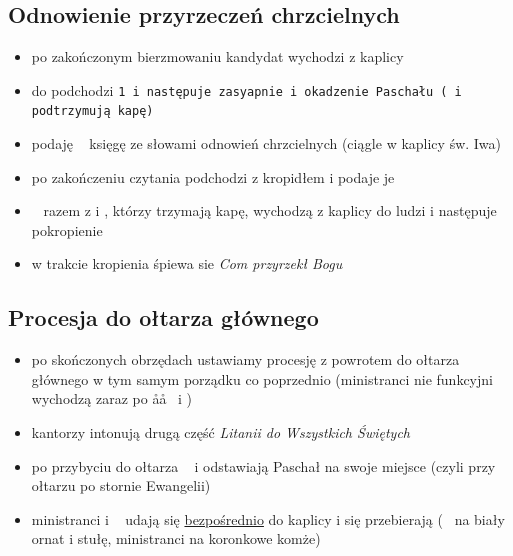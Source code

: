 \subsection{Odnowienie przyrzeczeń chrzcielnych}
\begin{itemize}
	\item po zakończonym bierzmowaniu kandydat wychodzi z kaplicy
	\item do  podchodzi \tt1 i następuje zasyapnie  i okadzenie Paschału
	      ( i  podtrzymują kapę)
	\item {} podaję \ii~ księgę ze słowami odnowień chrzcielnych (ciągle w
	      kaplicy św. Iwa)
	\item po zakończeniu czytania  podchodzi z kropidłem i podaje je 
	\item \ii~ razem z  i , którzy trzymają kapę, wychodzą z kaplicy do
	      ludzi i następuje pokropienie
	\item w trakcie kropienia śpiewa sie \textit{Com przyrzekł Bogu}
\end{itemize}
\subsection{Procesja do ołtarza głównego}
\begin{itemize}
	\item po skończonych obrzędach ustawiamy procesję z powrotem do ołtarza
	      głównego w tym samym porządku co poprzednio (ministranci nie funkcyjni
	      wychodzą zaraz po \aa\aa~ i )
	\item kantorzy intonują drugą część \textit{Litanii do Wszystkich Świętych}
	\item po przybyciu do ołtarza \paschal~ i  odstawiają Paschał na swoje
	      miejsce (czyli przy ołtarzu po stornie Ewangelii)
	\item ministranci i \ii~ udają się \underline{bezpośrednio} do kaplicy i się
	      przebierają (\ii~ na biały ornat i stułę, ministranci na koronkowe
	      komże)
\end{itemize}
